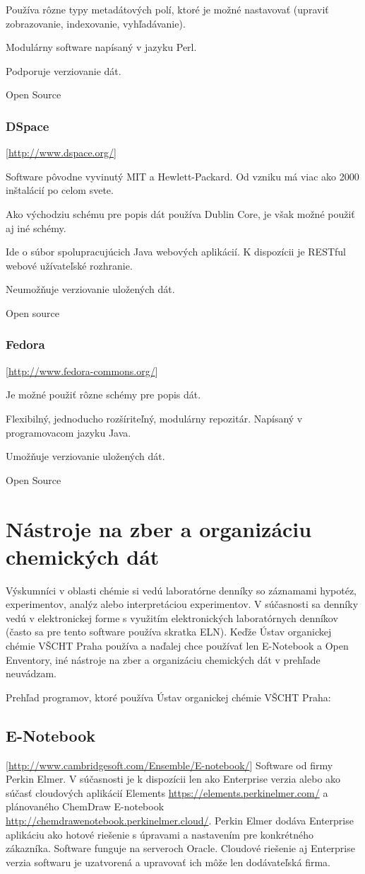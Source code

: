 \documentclass[thesis=M,slovak]{FITthesis}[2013/05/06]
\begin{document}
Používa rôzne typy metadátových polí, ktoré je možné nastavovať (upraviť zobrazovanie, indexovanie, vyhľadávanie).

Modulárny software napísaný v jazyku Perl.

Podporuje verziovanie dát.

Open Source

\subsubsection {DSpace} [\url{http://www.dspace.org/}]

Software pôvodne vyvinutý MIT a Hewlett-Packard. Od vzniku má viac ako 2000 inštalácií po celom svete. 

Ako východziu schému pre popis dát používa Dublin Core, je však možné použiť aj iné schémy.

Ide o súbor spolupracujúcich Java webových aplikácií. K dispozícii je RESTful webové užívateľské rozhranie.

Neumožňuje verziovanie uložených dát.

Open source

\subsubsection {Fedora} [\url{http://www.fedora-commons.org/}]

Je možné použiť rôzne schémy pre popis dát.

Flexibilný, jednoducho rozšíriteľný, modulárny repozitár. Napísaný v programovacom jazyku Java.

Umožňuje verziovanie uložených dát.

Open Source


\section{Nástroje na zber a organizáciu chemických dát}\label{ELN}
Výskumníci v oblasti chémie si vedú laboratórne denníky so záznamami hypotéz, experimentov, analýz alebo interpretáciou experimentov. V súčasnosti sa denníky vedú v elektronickej forme s využitím elektronických laboratórnych denníkov (často sa pre tento software používa skratka ELN). Keďže Ústav organickej chémie VŠCHT Praha používa a naďalej chce používať len E-Notebook a Open Enventory, iné nástroje na zber a organizáciu chemických dát v prehľade neuvádzam.

Prehľad programov, ktoré používa Ústav organickej chémie VŠCHT Praha:
\subsection{E-Notebook} [\url{http://www.cambridgesoft.com/Ensemble/E-notebook/}]
Software od firmy Perkin Elmer. V súčasnosti je k dispozícii len ako Enterprise verzia alebo ako súčasť cloudových aplikácií Elements \url{https://elements.perkinelmer.com/} a plánovaného ChemDraw E-notebook \url{http://chemdrawenotebook.perkinelmer.cloud/}. Perkin Elmer dodáva Enterprise aplikáciu ako hotové riešenie s úpravami a nastavením pre konkrétného zákazníka. Software funguje na serveroch Oracle. Cloudové riešenie aj Enterprise verzia softwaru je uzatvorená a upravovať ich môže len dodávateľská firma.
\end{document}
